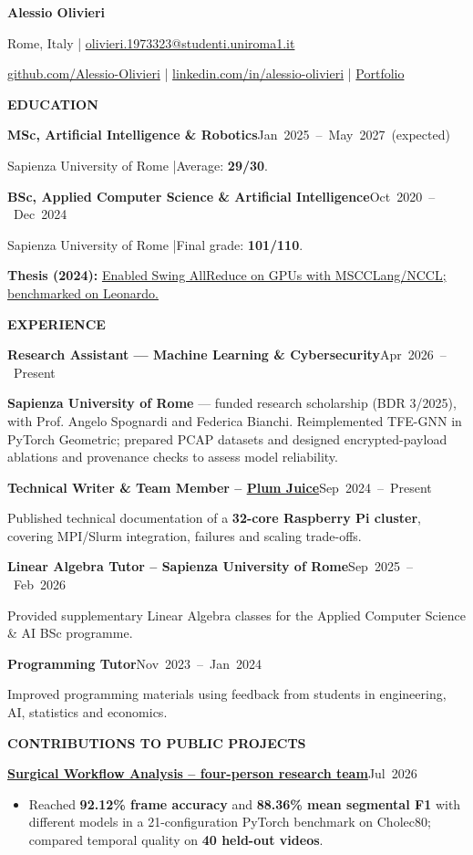 \documentclass[11pt,a4paper]{article}
\newcommand{\cvsection}[1]{%
  \par\addvspace{7pt}\needspace{40pt}%
  {\fontsize{11.2}{14}\selectfont\bfseries\MakeUppercase{#1}}\par
  \vspace{2pt}{\color{linecolor}\hrule height .4pt}\vspace{4pt}}
\newcommand{\entry}[2]{%
  \par\addvspace{4pt}\needspace{36pt}%
  {\bfseries #1}\hfill{\fontsize{9.6}{12}\selectfont\color{muted}\mbox{#2}}\par}
\newcommand{\project}[3]{%
  \entry{\href{#1}{#2}}{#3}}
\newcommand{\outcome}[1]{%
  \begin{itemize}\item #1\end{itemize}}
\begin{document}
{\fontsize{25}{28}\selectfont\bfseries Alessio Olivieri}\par
\vspace{5pt}
{\fontsize{9.5}{12}\selectfont
Rome, Italy \enspace|\enspace
\href{mailto:olivieri.1973323@studenti.uniroma1.it}{olivieri.1973323@studenti.uniroma1.it}\par
\vspace{1.5pt}
\href{https://github.com/Alessio-Olivieri}{github.com/Alessio-Olivieri}
\enspace|\enspace
\href{https://www.linkedin.com/in/alessio-olivieri/}{linkedin.com/in/alessio-olivieri}
\enspace|\enspace
\href{https://alessio-olivieri.github.io/}{Portfolio}}

\cvsection{Education}
\entry{MSc, Artificial Intelligence \& Robotics}{Jan 2025 -- May 2027 (expected)}
Sapienza University of Rome \enspace|\enspace Average: \textbf{29/30}.
\entry{BSc, Applied Computer Science \& Artificial Intelligence}{Oct 2020 -- Dec 2024}
Sapienza University of Rome \enspace|\enspace Final grade: \textbf{101/110}.\par
\textbf{Thesis (2024):}
\href{https://github.com/Alessio-Olivieri/msccl-tools}{Enabled Swing AllReduce on GPUs with MSCCLang/NCCL; benchmarked on Leonardo.}

\cvsection{Experience}
\entry{Research Assistant --- Machine Learning \& Cybersecurity}{Apr 2026 -- Present}
\textbf{Sapienza University of Rome} --- funded research scholarship (BDR 3/2025), with Prof. Angelo Spognardi and Federica Bianchi. Reimplemented TFE-GNN in PyTorch Geometric; prepared PCAP datasets and designed encrypted-payload ablations and provenance checks to assess model reliability.

\entry{Technical Writer \& Team Member -- \href{https://plum-juice-project.github.io/plum-io/}{Plum Juice}}{Sep 2024 -- Present}
Published technical documentation of a \textbf{32-core Raspberry Pi cluster}, covering MPI/Slurm integration, failures and scaling trade-offs.

\entry{Linear Algebra Tutor -- Sapienza University of Rome}{Sep 2025 -- Feb 2026}
Provided supplementary Linear Algebra classes for the Applied Computer Science \& AI BSc programme.

\entry{Programming Tutor}{Nov 2023 -- Jan 2024}
Improved programming materials using feedback from students in engineering, AI, statistics and economics.

\cvsection{Contributions to Public Projects}
\project{https://github.com/Sapienza-Corvino/Sapienza_MR_SurgicalWorkflowAnalysis}
  {Surgical Workflow Analysis -- four-person research team}{Jul 2026}
\outcome{Reached \textbf{92.12\% frame accuracy} and \textbf{88.36\% mean segmental F1} with different models in a 21-configuration PyTorch benchmark on Cholec80; compared temporal quality on \textbf{40 held-out videos}.}
\end{document}
